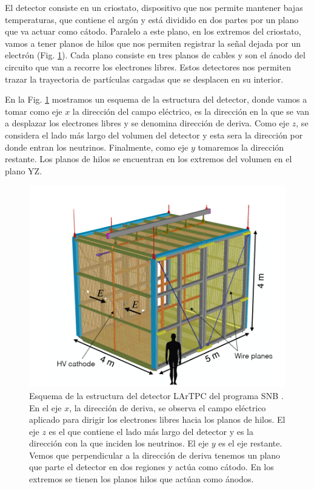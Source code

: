 \documentclass[a4paper,12pt,twoside,titlepage]{article}
\begin{document}
El detector consiste en un criostato, dispositivo que nos permite mantener bajas temperaturas, que contiene el argón y está dividido en dos partes por un plano que va actuar como cátodo. Paralelo a este plano, en los extremos del criostato, vamos a tener planos de hilos que nos permiten registrar la señal dejada por un electrón (Fig. \ref{fig:estructura_detector}). Cada plano consiste en tres planos de cables y son el ánodo del circuito que van a recorre los electrones libres. Estos detectores nos permiten trazar la trayectoria de partículas cargadas que se desplacen en su interior.

En la Fig. \ref{fig:estructura_detector} mostramos un esquema de la estructura del detector, donde vamos a tomar como eje $x$ la dirección del campo eléctrico, es la dirección en la que se van a desplazar los electrones libres y se denomina dirección de deriva. Como eje $z$, se considera el lado más largo del volumen del detector y esta sera la dirección por donde entran los neutrinos. Finalmente, como eje $y$ tomaremos la dirección restante. Los planos de hilos se encuentran en los extremos del volumen en el plano YZ.

\begin{figure}[h!]
  \centering
  \includegraphics[scale=0.45]{estructura_detector.PNG}
  \caption{Esquema de la estructura del detector LArTPC del programa SNB \cite{sbnd}. En el eje $x$, la dirección de deriva, se observa el campo eléctrico aplicado para dirigir los electrones libres hacia los planos de hilos. El eje $z$ es el que contiene el lado más largo del detector y es la dirección con la que inciden los neutrinos. El eje $y$ es el eje restante. Vemos que perpendicular a la dirección de deriva tenemos un plano que parte el detector en dos regiones y actúa como cátodo. En los extremos se tienen los planos hilos que actúan como ánodos.}
  \label{fig:estructura_detector}
\end{figure}
\end{document}
